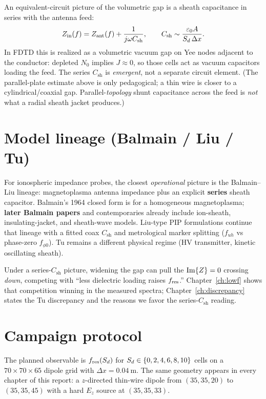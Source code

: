 An equivalent-circuit picture of the volumetric gap is a sheath capacitance in series with the antenna feed:
\begin{equation}
Z_{\mathrm{in}}(f)=Z_{\mathrm{ant}}(f)+\frac{1}{j\omega C_{\mathrm{sh}}},
\qquad
C_{\mathrm{sh}}\sim\frac{\varepsilon_0 A}{S_d\,\Delta x}.
\end{equation}
In FDTD this is realized as a volumetric vacuum gap on Yee nodes adjacent to the conductor: depleted \(N_0\) implies \(J\approx 0\), so those cells act as vacuum capacitors loading the feed. The series \(C_{\mathrm{sh}}\) is \emph{emergent}, not a separate circuit element. (The parallel-plate estimate above is only pedagogical; a thin wire is closer to a cylindrical/coaxial gap. Parallel-\emph{topology} shunt capacitance across the feed is \emph{not} what a radial sheath jacket produces.)

\section{Model lineage (Balmain / Liu / Tu)}

For ionospheric impedance probes, the closest \emph{operational} picture is the Balmain--Liu lineage: magnetoplasma antenna impedance plus an explicit \textbf{series} sheath capacitor. Balmain's 1964 closed form is for a homogeneous magnetoplasma; \textbf{later Balmain papers} and contemporaries already include ion-sheath, insulating-jacket, and sheath-wave models. Liu-type PIP formulations continue that lineage with a fitted coax \(C_{\mathrm{sh}}\) and metrological marker splitting (\(f_{uh}\) vs phase-zero \(f_{\phi0}\)). Tu remains a different physical regime (HV transmitter, kinetic oscillating sheath).

Under a series-\(C_{\mathrm{sh}}\) picture, widening the gap can pull the \(\operatorname{Im}\{Z\}=0\) crossing \emph{down}, competing with ``less dielectric loading raises \(f_{\mathrm{res}}\).'' Chapter~\ref{ch:lowf} shows that competition winning in the measured spectra; Chapter~\ref{ch:discrepancy} states the Tu discrepancy and the reasons we favor the series-\(C_{\mathrm{sh}}\) reading.

\section{Campaign protocol}

The planned observable is \(f_{\mathrm{res}}(S_d)\) for \(S_d\in\{0,2,4,6,8,10\}\) cells on a \(70\times 70\times 65\) dipole grid with \(\Delta x=\SI{0.04}{\meter}\). The same geometry appears in every chapter of this report: a \(z\)-directed thin-wire dipole from \((35,35,20)\) to \((35,35,45)\) with a hard \(E_z\) source at \((35,35,33)\).


